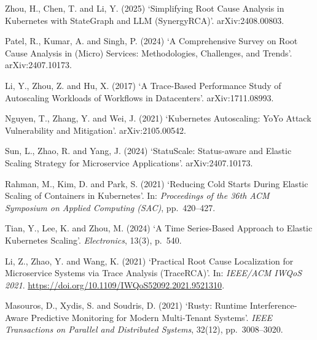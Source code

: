 \vspace{1em}

\noindent
Zhou, H., Chen, T. and Li, Y. (2025) `Simplifying Root Cause Analysis in Kubernetes with StateGraph and LLM (SynergyRCA)'. arXiv:2408.00803.

\vspace{1em}

\noindent
Patel, R., Kumar, A. and Singh, P. (2024) `A Comprehensive Survey on Root Cause Analysis in (Micro) Services: Methodologies, Challenges, and Trends'. arXiv:2407.10173.

\vspace{1em}

\noindent
Li, Y., Zhou, Z. and Hu, X. (2017) `A Trace-Based Performance Study of Autoscaling Workloads of Workflows in Datacenters'. arXiv:1711.08993.

\vspace{1em}

\noindent
Nguyen, T., Zhang, Y. and Wei, J. (2021) `Kubernetes Autoscaling: YoYo Attack Vulnerability and Mitigation'. arXiv:2105.00542.

\vspace{1em}

\noindent
Sun, L., Zhao, R. and Yang, J. (2024) `StatuScale: Status-aware and Elastic Scaling Strategy for Microservice Applications'. arXiv:2407.10173.

\vspace{1em}

\noindent
Rahman, M., Kim, D. and Park, S. (2021) `Reducing Cold Starts During Elastic Scaling of Containers in Kubernetes'. In: \textit{Proceedings of the 36th ACM Symposium on Applied Computing (SAC)}, pp.~420--427.

\vspace{1em}

\noindent
Tian, Y., Lee, K. and Zhou, M. (2024) `A Time Series-Based Approach to Elastic Kubernetes Scaling'. \textit{Electronics}, 13(3), p.~540.

\vspace{1em}

\noindent
Li, Z., Zhao, Y. and Wang, K. (2021) `Practical Root Cause Localization for Microservice Systems via Trace Analysis (TraceRCA)'. In: \textit{IEEE/ACM IWQoS 2021}. \url{https://doi.org/10.1109/IWQoS52092.2021.9521310}.

\vspace{1em}

\noindent
Masouros, D., Xydis, S. and Soudris, D. (2021) `Rusty: Runtime Interference-Aware Predictive Monitoring for Modern Multi-Tenant Systems'. \textit{IEEE Transactions on Parallel and Distributed Systems}, 32(12), pp.~3008--3020.

